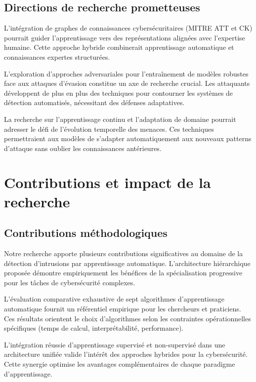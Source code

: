 \subsection{Directions de recherche prometteuses}

L'intégration de graphes de connaissances cybersécuritaires (MITRE ATT et CK) pourrait guider l'apprentissage vers des représentations alignées avec l'expertise humaine. Cette approche hybride combinerait apprentissage automatique et connaissances expertes structurées.

L'exploration d'approches adversariales pour l'entraînement de modèles robustes face aux attaques d'évasion constitue un axe de recherche crucial. Les attaquants développent de plus en plus des techniques pour contourner les systèmes de détection automatisés, nécessitant des défenses adaptatives.

La recherche sur l'apprentissage continu et l'adaptation de domaine pourrait adresser le défi de l'évolution temporelle des menaces. Ces techniques permettraient aux modèles de s'adapter automatiquement aux nouveaux patterns d'attaque sans oublier les connaissances antérieures.

\section{Contributions et impact de la recherche}

\subsection{Contributions méthodologiques}

Notre recherche apporte plusieurs contributions significatives au domaine de la détection d'intrusions par apprentissage automatique. L'architecture hiérarchique proposée démontre empiriquement les bénéfices de la spécialisation progressive pour les tâches de cybersécurité complexes.

L'évaluation comparative exhaustive de sept algorithmes d'apprentissage automatique fournit un référentiel empirique pour les chercheurs et praticiens. Ces résultats orientent le choix d'algorithmes selon les contraintes opérationnelles spécifiques (temps de calcul, interprétabilité, performance).

L'intégration réussie d'apprentissage supervisé et non-supervisé dans une architecture unifiée valide l'intérêt des approches hybrides pour la cybersécurité. Cette synergie optimise les avantages complémentaires de chaque paradigme d'apprentissage.


